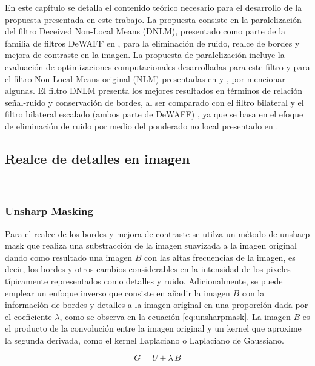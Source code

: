 En este cap\'itulo se detalla el contenido te\'orico necesario para el desarrollo de la propuesta presentada en este trabajo. La propuesta consiste en la paralelizaci\'on del filtro Deceived Non-Local Means (DNLM), presentado como parte de la familia de filtros DeWAFF en \cite{calderon2015dewaff}, para la eliminaci\'on de ruido, realce de bordes y mejora de contraste en la imagen. La propuesta de paralelizaci\'on incluye la evaluaci\'on de optimizaciones computacionales desarrolladas para este filtro y para el filtro Non-Local Means original (NLM) presentadas en \cite{CalderonRamirez2017} y \cite{Condat2010, Darbon2008}, por mencionar algunas.
El filtro DNLM presenta los mejores resultados en t\'erminos de relaci\'on se\~nal-ruido y conservaci\'on de bordes, al ser comparado con el filtro bilateral y el filtro bilateral escalado (ambos parte de DeWAFF) \cite{calderon2015dewaff}, ya que se basa en el efoque de eliminaci\'on de ruido por medio del ponderado no local presentado en \cite{buades2005non}. 



\subsection{Realce de detalles en imagen}\

\subsubsection{Unsharp Masking}

Para el realce de los bordes y mejora de contraste se utilza un m\'etodo de unsharp mask que realiza una substracci\'on de la imagen suavizada a la imagen original dando como resultado una imagen $B$ con las altas frecuencias de la imagen, es decir, los bordes y otros cambios considerables en la intensidad de los pixeles t\'ipicamente representados como detalles y ruido. Adicionalmente, se puede emplear un enfoque inverso que consiste en a\~nadir la imagen $B$ con la informaci\'on de bordes y detalles a la imagen original en una proporci\'on dada por el coeficiente $\lambda$, como se observa en la ecuaci\'on \ref{eq:unsharpmask}. La imagen $B$ es el producto de la convoluci\'on entre la imagen original y un kernel que aproxime la segunda derivada, como el kernel Laplaciano o Laplaciano de Gaussiano.

\begin{equation}
\label{eq:unsharpmask}
G=U+\lambda\,B
\end{equation}

